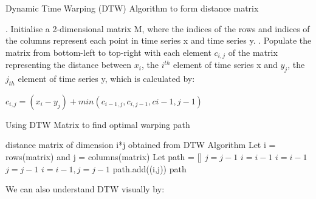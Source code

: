 \documentclass[nonblindrev,msom]{informs3} %
\begin{document}
\newpage
\begin{algorithm}[H]
\caption{Dynamic Time Warping (DTW) Algorithm to form distance matrix}
\begin{algorithmic}
\STATE 
{}. Initialise a 2-dimensional matrix M, where the indices of the rows and indices of the columns represent each point in time series x and time series y. 
. Populate the matrix from bottom-left to top-right with each element $c_{i,j}$ of the matrix representing the distance between $x_i$, the $i^{th}$ element of time series x and $y_j$, the $j_{th}$ element of time series y, which is calculated by:

\begin{center}
$c_{i,j} = (x_i - y_j) + min(c_{i-1,j}, c_{i,j-1}, c{i-1,j-1})$
\end{center}

\end{algorithmic}
\end{algorithm}

\begin{algorithm}[H]
\caption{Using DTW Matrix to find optimal warping path}
\begin{algorithmic}
\REQUIRE distance matrix of dimension i*j obtained from DTW Algorithm
\STATE Let i = rows(matrix) and j = columns(matrix)
\STATE Let path = []
\STATE $j = j-1$
\STATE $i = i-1$
\ELSE
{}
\STATE $i = i - 1$
\STATE $j = j - 1$
\ELSE
\STATE $i = i - 1, j = j - 1$
\ENDIF
path.add((i,j))
\ENDIF
\ENDWHILE
\RETURN path
\end{algorithmic}
\end{algorithm}


\newpage
\noindent We can also understand DTW visually by:
\end{document}
